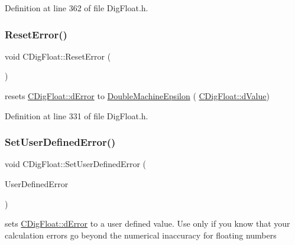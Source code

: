 Definition at line 362 of file Dig\+Float.\+h.

\mbox{\label{classCDigFloat_a47dd744a2100dc850ede1511e616ed39}} 
\subsubsection{\texorpdfstring{Reset\+Error()}{ResetError()}}
{\footnotesize\ttfamily void C\+Dig\+Float\+::\+Reset\+Error (\begin{DoxyParamCaption}{ }\end{DoxyParamCaption})\hspace{0.3cm}{\ttfamily [inline]}}



resets \hyperlink{classCDigFloat_a25eb3782d1e727ff007a48f8308e3d4d}{C\+Dig\+Float\+::d\+Error} to \hyperlink{Utils_8h_ae9dfc174daaf6261f167ccc069efea93}{Double\+Machine\+Epsilon} ( \hyperlink{classCDigFloat_a4bbe69e30dd4e20527362493aa9aaf96}{C\+Dig\+Float\+::d\+Value}) 



Definition at line 331 of file Dig\+Float.\+h.

\mbox{\label{classCDigFloat_a63f2632e5a762f37aa6eda4510c57502}} 
\subsubsection{\texorpdfstring{Set\+User\+Defined\+Error()}{SetUserDefinedError()}}
{\footnotesize\ttfamily void C\+Dig\+Float\+::\+Set\+User\+Defined\+Error (\begin{DoxyParamCaption}\item[{const \hyperlink{classCDigFloat}{C\+Dig\+Float} \&}]{User\+Defined\+Error }\end{DoxyParamCaption})\hspace{0.3cm}{\ttfamily [inline]}}



sets \hyperlink{classCDigFloat_a25eb3782d1e727ff007a48f8308e3d4d}{C\+Dig\+Float\+::d\+Error} to a user defined value. Use only if you know that your calculation errors go beyond the numerical inaccuracy for floating numbers 


